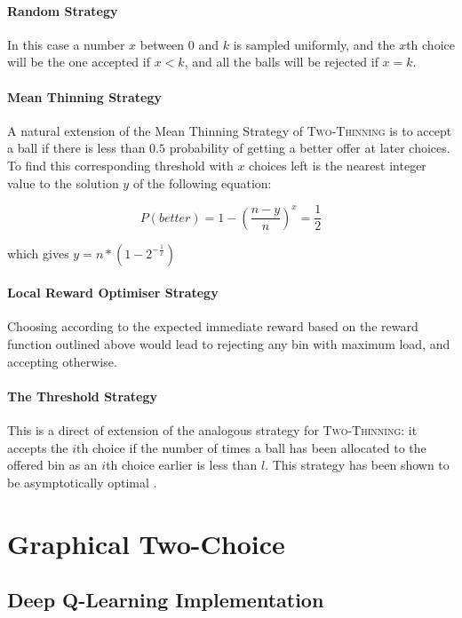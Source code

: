 \paragraph{Random Strategy} In this case a number $x$ between $0$ and $k$ is sampled uniformly, and the $x$th choice will be the one accepted if $x<k$, and all the balls will be rejected if $x=k$.



\paragraph{Mean Thinning Strategy} A natural extension of the Mean Thinning Strategy of \textsc{Two-Thinning} is to accept a ball if there is less than $0.5$ probability of getting a better offer at later choices. To find this corresponding threshold with $x$ choices left is the nearest integer value to the solution $y$ of the following equation:

\begin{equation} \label{meankthinning}
    P(better) = 1 - (\frac{n-y}{n})^x = \frac{1}{2}
\end{equation}

which gives $y = n * (1 - 2^{-\frac{1}{x}})$


\paragraph{Local Reward Optimiser Strategy} Choosing according to the expected immediate reward based on the reward function outlined above would lead to rejecting any bin with maximum load, and accepting otherwise.


\paragraph{The Threshold Strategy} This is a direct of extension of the analogous strategy for \textsc{Two-Thinning}: it accepts the $i$th choice if the number of times a ball has been allocated to the offered bin as an $i$th choice earlier is less than $l$. This strategy has been shown to be asymptotically optimal \cite{feldheim2020dthinning}.



\section{Graphical Two-Choice}



\subsection{Deep Q-Learning Implementation} \label{graphical-DQN}

